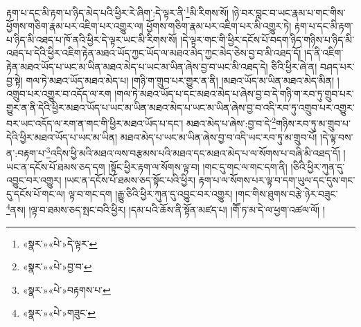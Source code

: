 རྟག་པ་དང་མི་རྟག་པ་ཉིད་མེད་པའི་ཕྱིར་རེ་ཞིག་:དེ་ལྟར་ནི་\footnote{«སྣར་»«པེ་»དེ་ལྟར་}མི་རིགས་སོ། །ཉེ་བར་བླང་བ་ཡང་རྣམ་པ་གང་གིས་ཕྱོགས་གཅིག་རྣམ་པར་འཇིག་པར་འགྱུར་ལ། ཕྱོགས་གཅིག་རྣམ་པར་འཇིག་པར་མི་འགྱུར་ཏེ། རྟག་པ་དང་མི་རྟག་པ་ཉིད་མི་འཐད་པ་ཁོ་ནའི་ཕྱིར་དེ་ལྟར་ཡང་མི་རིགས་སོ། །དེ་ལྟར་གང་གི་ཕྱིར་དངོས་པོ་བདག་ཉིད་གཉིས་པ་ཉིད་མི་འཐད་པ་དེའི་ཕྱིར་འཇིག་རྟེན་མཐའ་ཡོད་ཀྱང་ཡོད་ལ་མཐའ་མེད་ཀྱང་མེད་ཅེས་བྱ་བ་མི་འཐད་དོ། །ད་ནི་འཇིག་རྟེན་མཐའ་ཡོད་པ་ཡང་མ་ཡིན་མཐའ་མེད་པ་ཡང་མ་ཡིན་ཞེས་བྱ་བ་ཡང་མི་འཐད་དེ། ཅིའི་ཕྱིར་ཞེ་ན། བཤད་པར་བྱ་སྟེ། གལ་ཏེ་མཐའ་ཡོད་མཐའ་མེད་པ། །གཉི་ག་གྲུབ་པར་གྱུར་ན་ནི། །མཐའ་ཡོད་མ་ཡིན་མཐའ་མེད་མིན། །འགྲུབ་པར་འགྱུར་བ་འདོད་ལ་རག །གལ་ཏེ་མཐའ་ཡོད་པ་དང་མཐའ་མེད་པ་ཞེས་བྱ་བ་དེ་གཉི་ག་རབ་ཏུ་གྲུབ་པར་གྱུར་ན་ནི་དེའི་ཕྱིར་མཐའ་ཡོད་པ་ཡང་མ་ཡིན་མཐའ་མེད་པ་ཡང་མ་ཡིན་ཞེས་བྱ་བ་འདི་རབ་ཏུ་འགྲུབ་པར་འགྱུར་བར་ཡང་འདོད་ལ་རག་ན་གང་གི་ཕྱིར་མཐའ་ཡོད་པ་དང་། མཐའ་མེད་པ་ཞེས་:བྱ་བ་དེ་\footnote{«སྣར་»«པེ་»བྱ་བ་}གཉིས་རབ་ཏུ་མ་གྲུབ་པ་དེའི་ཕྱིར་མཐའ་ཡོད་པ་ཡང་མ་ཡིན། མཐའ་མེད་པ་ཡང་མ་ཡིན་ཞེས་བྱ་བ་འདི་ཡང་རབ་ཏུ་མ་གྲུབ་པོ། །དེ་ལྟ་བས་ན་:བརྟག་པ་\footnote{«སྣར་»«པེ་»བརྟགས་པ་}འདིས་ཕྱི་མའི་མཐའ་ལས་བརྩམས་པའི་མཐའ་དང་མཐའ་མེད་པ་ལ་སོགས་པ་བཞི་མི་འཐད་དོ། །ཡང་ན་དངོས་པོ་ཐམས་ཅད་དག །སྟོང་ཕྱིར་རྟག་ལ་སོགས་ལྟ་བ། །གང་དུ་གང་ལ་གང་དག་ནི། །ཅིའི་ཕྱིར་ཀུན་དུ་འབྱུང་བར་འགྱུར། །ཡང་ན་དངོས་པོ་ཐམས་ཅད་སྟོང་པའི་ཕྱིར། རྟག་པ་ལ་སོགས་པར་ལྟ་བ་དག་ཡུལ་དང་དུས་གང་དུ་དངོས་པོ་གང་ལ། ལྟ་བ་གང་དག །རྒྱུ་ཅིའི་ཕྱིར་ཀུན་དུ་འབྱུང་བར་འགྱུར། །གང་གིས་ཐུགས་བརྩེ་ཉེར་བཟུང་\footnote{«སྣར་»«པེ་»གཟུང་}ནས། །ལྟ་བ་ཐམས་ཅད་སྤང་བའི་ཕྱིར། །དམ་པའི་ཆོས་ནི་སྟོན་མཛད་པ། །གཽ་ཏ་མ་དེ་ལ་ཕྱག་འཚལ་ལོ། །
